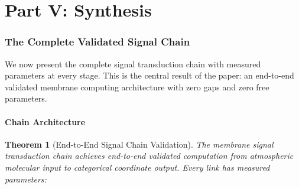 \documentclass[12pt]{article}
\newtheorem{theorem}{Theorem}[section]
\theoremstyle{definition}
\theoremstyle{remark}
\begin{document}
\part*{Part V: Synthesis}

\section{The Complete Validated Signal Chain}
\label{sec:signal_chain}

We now present the complete signal transduction chain with measured parameters at every stage. This is the central result of the paper: an end-to-end validated membrane computing architecture with zero gaps and zero free parameters.

\subsection{Chain Architecture}

\begin{theorem}[End-to-End Signal Chain Validation]
\label{thm:chain}
The membrane signal transduction chain achieves end-to-end validated computation from atmospheric molecular input to categorical coordinate output. Every link has measured parameters:
\end{theorem}
\end{document}
